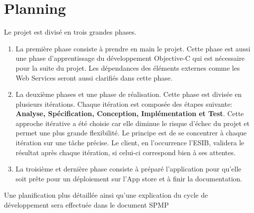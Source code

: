 \section{Planning}

Le projet est divisé en trois grandes phases.
\begin{enumerate}
\item La première phase consiste à prendre en main le projet. Cette phase est aussi une phase d'apprentissage du développement \gls{Objective-C} qui est nécessaire pour la suite du projet. Les dépendances des éléments externes comme les Web Services seront aussi clarifiés dans cette phase.
\item La deuxième phases et une phase de réalisation. Cette phase est divisée en plusieurs itérations. Chaque itération est composée des étapes suivante: \textbf{Analyse, Spécification, Conception, Implémentation et Test}. Cette approche itérative a été choisie car elle diminue le risque d'échec du projet et permet une plus grande flexibilité. Le principe est de se concentrer à chaque itération sur une tâche précise. Le client, en l'occurrence l'\gls{ESIB}, validera le résultat après chaque itération, si celui-ci correspond bien à ses attentes.
\item La troisième et dernière phase consiste à préparé l'application pour qu'elle soit prête pour un déploiement sur l'App store et à finir la documentation.
\end{enumerate}
Une planification plus détaillée ainsi qu'une explication du cycle de développement sera effectuée dans le document \gls{SPMP}